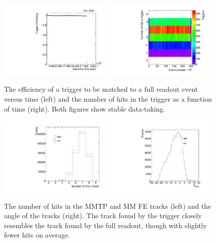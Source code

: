 \begin{figure}[!htpb]
  \begin{center}
    \includegraphics[width=0.48\textwidth]{figures/gbtanalysis3522/tpeff.pdf}
    \includegraphics[width=0.48\textwidth]{figures/tuna_analysis/trigger_hits_vs_event.pdf}
  \end{center}
  \vspace{-10pt}
  \caption{The efficiency of a trigger to be matched to a full readout event versus time (left) and the number of hits in the trigger as a function of time (right). Both figures show stable data-taking.}
  \label{fig:lowlevel}
\end{figure}

\begin{figure}[!htpb]
  \begin{center}
    \includegraphics[width=0.48\textwidth]{figures/tuna_analysis/trigger_nart.pdf}
    \includegraphics[width=0.48\textwidth]{figures/gbtanalysis3522/ang.pdf}
  \end{center}
  \vspace{-10pt}
  \caption{The number of hits in the MMTP and MM FE tracks (left) and the angle of the tracks (right). The track found by the trigger closely resembles the track found by the full readout, though with slightly fewer hits on average.}
  \label{fig:tp_vs_fe}
\end{figure}

